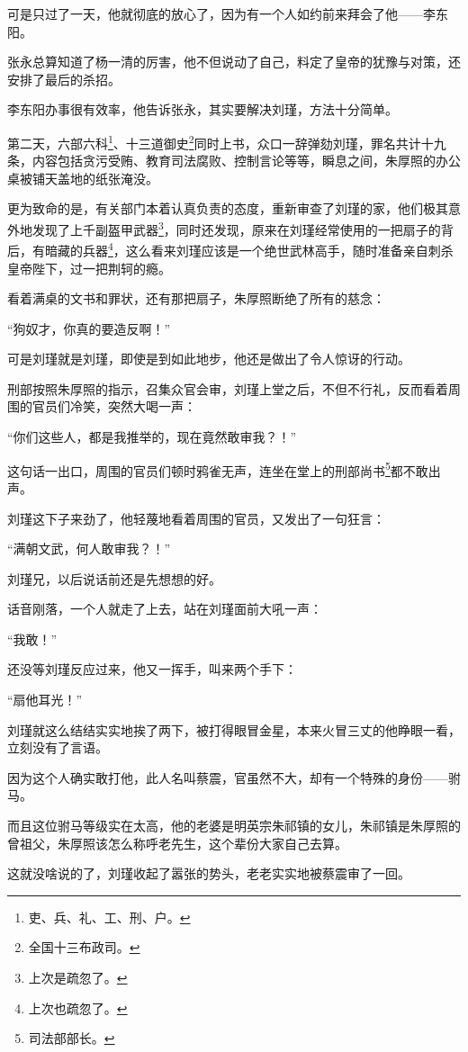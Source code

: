 \begin{multicols}{\theparacolNo}
可是只过了一天，他就彻底的放心了，因为有一个人如约前来拜会了他——李东阳。

张永总算知道了杨一清的厉害，他不但说动了自己，料定了皇帝的犹豫与对策，还安排了最后的杀招。

李东阳办事很有效率，他告诉张永，其实要解决刘瑾，方法十分简单。

第二天，六部六科\footnote{吏、兵、礼、工、刑、户。}、十三道御史\footnote{全国十三布政司。}同时上书，众口一辞弹劾刘瑾，罪名共计十九条，内容包括贪污受贿、教育司法腐败、控制言论等等，瞬息之间，朱厚照的办公桌被铺天盖地的纸张淹没。

更为致命的是，有关部门本着认真负责的态度，重新审查了刘瑾的家，他们极其意外地发现了上千副盔甲武器\footnote{上次是疏忽了。}，同时还发现，原来在刘瑾经常使用的一把扇子的背后，有暗藏的兵器\footnote{上次也疏忽了。}，这么看来刘瑾应该是一个绝世武林高手，随时准备亲自刺杀皇帝陛下，过一把荆轲的瘾。

看着满桌的文书和罪状，还有那把扇子，朱厚照断绝了所有的慈念：

“狗奴才，你真的要造反啊！”

可是刘瑾就是刘瑾，即使是到如此地步，他还是做出了令人惊讶的行动。

刑部按照朱厚照的指示，召集众官会审，刘瑾上堂之后，不但不行礼，反而看着周围的官员们冷笑，突然大喝一声：

“你们这些人，都是我推举的，现在竟然敢审我？！”

这句话一出口，周围的官员们顿时鸦雀无声，连坐在堂上的刑部尚书\footnote{司法部部长。}都不敢出声。

刘瑾这下子来劲了，他轻蔑地看着周围的官员，又发出了一句狂言：

“满朝文武，何人敢审我？！”

刘瑾兄，以后说话前还是先想想的好。

话音刚落，一个人就走了上去，站在刘瑾面前大吼一声：

“我敢！”

还没等刘瑾反应过来，他又一挥手，叫来两个手下：

“扇他耳光！”

刘瑾就这么结结实实地挨了两下，被打得眼冒金星，本来火冒三丈的他睁眼一看，立刻没有了言语。

因为这个人确实敢打他，此人名叫蔡震，官虽然不大，却有一个特殊的身份——驸马。

而且这位驸马等级实在太高，他的老婆是明英宗朱祁镇的女儿，朱祁镇是朱厚照的曾祖父，朱厚照该怎么称呼老先生，这个辈份大家自己去算。

这就没啥说的了，刘瑾收起了嚣张的势头，老老实实地被蔡震审了一回。


\end{multicols}
